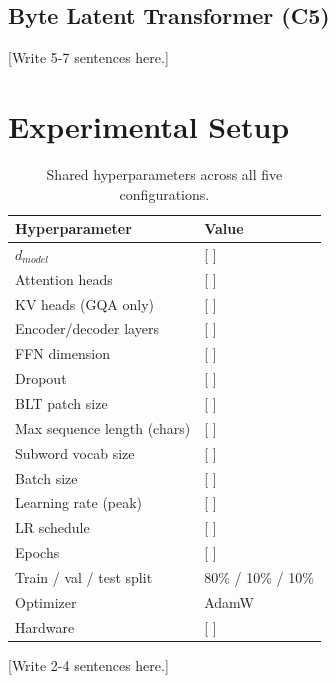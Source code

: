 \documentclass[12pt]{article}
\begin{document}
\subsection{Byte Latent Transformer (C5)}
[Write 5-7 sentences here.]

\section{Experimental Setup}

\begin{table}[h]
\centering
\caption{Shared hyperparameters across all five configurations.}
\begin{tabular}{ll}
\toprule
Hyperparameter & Value \\
\midrule
$d_{model}$ & [ ] \\
Attention heads & [ ] \\
KV heads (GQA only) & [ ] \\
Encoder/decoder layers & [ ] \\
FFN dimension & [ ] \\
Dropout & [ ] \\
BLT patch size & [ ] \\
Max sequence length (chars) & [ ] \\
Subword vocab size & [ ] \\
Batch size & [ ] \\
Learning rate (peak) & [ ] \\
LR schedule & [ ] \\
Epochs & [ ] \\
Train / val / test split & 80\% / 10\% / 10\% \\
Optimizer & AdamW \\
Hardware & [ ] \\
\bottomrule
\end{tabular}
\end{table}

[Write 2-4 sentences here.]
\end{document}
